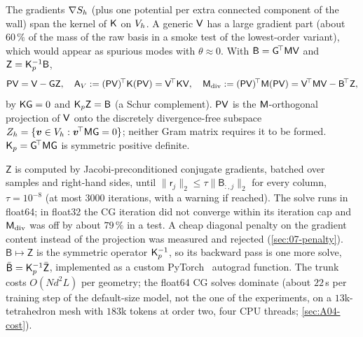 The gradients $\nabla S_h$ (plus one potential per extra connected component of the wall) span the kernel of $\mathsf{K}$ on $V_h$.
A generic $\mathsf{V}$ has a large gradient part (about $60\,\%$ of the mass of the raw basis in a smoke test of the lowest-order variant), which would appear as spurious modes with $\theta\approx0$.
With $\mathsf B=\mathsf{G}^{\!\top}\mathsf{M}\mathsf{V}$ and $\mathsf Z=\Kp^{-1}\mathsf B$,
\begin{equation}\label{eq:04-proj}
  \Pmat\Vmat=\Vmat-\Gmat\mathsf Z,\quad
  \Av:=(\Pmat\Vmat)^{\!\top}\Kmat(\Pmat\Vmat)=\Vmat^{\!\top}\Kmat\Vmat,\quad
  \Mdiv:=(\Pmat\Vmat)^{\!\top}\Mmat(\Pmat\Vmat)=\Vmat^{\!\top}\Mmat\Vmat-\mathsf B^{\!\top}\mathsf Z,
\end{equation}
by $\mathsf{K}\mathsf{G}=0$ and $\Kp\mathsf Z=\mathsf B$ (a Schur complement).
$\mathsf{P}\mathsf{V}$ is the $\mathsf{M}$-orthogonal projection of $\mathsf{V}$ onto the discretely divergence-free subspace $Z_h=\{\bm v\in V_h:\bm v^{\!\top}\mathsf{M}\mathsf{G}=0\}$; neither Gram matrix requires it to be formed.
$\Kp=\Gmat^{\!\top}\Mmat\Gmat$ is symmetric positive definite.

$\mathsf Z$ is computed by Jacobi-preconditioned conjugate gradients, batched over samples and right-hand sides, until $\|\mathsf r_j\|_2\le\tau\|\mathsf B_{:,j}\|_2$ for every column, $\tau=10^{-8}$ (at most $3000$ iterations, with a warning if reached).
The solve runs in float64; in float32 the CG iteration did not converge within its iteration cap and $\Mdiv$ was off by about $79\,\%$ in a test.
A cheap diagonal penalty on the gradient content instead of the projection was measured and rejected (\cref{sec:07-penalty}).
$\mathsf B\mapsto\mathsf Z$ is the symmetric operator $\Kp^{-1}$, so its backward pass is one more solve, $\bar{\mathsf B}=\Kp^{-1}\bar{\mathsf Z}$, implemented as a custom PyTorch~\cite{paszke2019pytorch} autograd function.
The trunk costs $O(Nd^2L)$ per geometry; the float64 CG solves dominate (about $22$\,s per training step of the default-size model, not the one of the experiments, on a $13$k-tetrahedron mesh with $183$k tokens at order two, four CPU threads; \cref{sec:A04-cost}).


